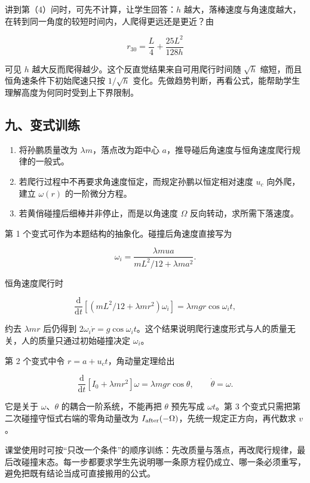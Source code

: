 \documentclass[12pt,a4paper,UTF8]{ctexart}
\newcommand{\tightlist}{\setlength{\itemsep}{0pt}\setlength{\parskip}{0pt}}
\begin{document}
讲到第（4）问时，可先不计算，让学生回答：\(h\)
越大，落棒速度与角速度越大，在转到同一角度的较短时间内，人爬得更远还是更近？由

\[r_{30}=\frac L4+\frac{25L^2}{128h}\]

可见 \(h\) 越大反而爬得越少。这个反直觉结果来自可用爬行时间随
\(\sqrt h\) 缩短，而且恒角速条件下初始爬速只按 \(1/\sqrt h\)
变化。先做趋势判断，再看公式，能帮助学生理解高度为何同时受到上下界限制。

\subsection{九、变式训练}\label{ux4e5dux53d8ux5f0fux8badux7ec3}

\begin{enumerate}
\def\labelenumi{\arabic{enumi}.}
\tightlist
\item
  将孙鹏质量改为 \(\lambda m\)，落点改为距中心
  \(a\)，推导碰后角速度与恒角速度爬行规律的一般式。
\item
  若爬行过程中不再要求角速度恒定，而规定孙鹏以恒定相对速度 \(u_c\)
  向外爬，建立 \(\omega(r)\) 的一阶微分方程。
\item
  若黄俏碰撞后细棒并非停止，而是以角速度 \(\Omega\)
  反向转动，求所需下落速度。
\end{enumerate}

第 1 个变式可作为本题结构的抽象化。碰撞后角速度直接写为

\[\omega_i=\frac{\lambda m u a}{mL^2/12+\lambda ma^2}.\]

恒角速度爬行时

\[\frac{\mathrm d}{\mathrm dt}[(mL^2/12+\lambda mr^2)\omega_i]
=\lambda mgr\cos\omega_i t,\]

约去 \(\lambda mr\) 后仍得到
\(2\omega_i\dot r=g\cos\omega_i t\)。这个结果说明爬行速度形式与人的质量无关，人的质量只通过初始碰撞决定
\(\omega_i\)。

第 2 个变式中令 \(r=a+u_ct\)，角动量定理给出

\[\frac{\mathrm d}{\mathrm dt}{[I_0+\lambda mr^2]\omega}
=\lambda mgr\cos\theta,\qquad \dot\theta=\omega.\]

它是关于 \(\omega\)、\(\theta\) 的耦合一阶系统，不能再把 \(\theta\)
预先写成 \(\omega t\)。第 3
个变式只需把第二次碰撞守恒式右端的零角动量改为
\(I_{\rm after}(-\Omega)\)，先统一规定正方向，再代数求 \(v\)。

课堂使用时可按``只改一个条件''的顺序训练：先改质量与落点，再改爬行规律，最后改碰撞末态。每一步都要求学生先说明哪一条原方程仍成立、哪一条必须重写，避免把既有结论当成可直接搬用的公式。
\end{document}
